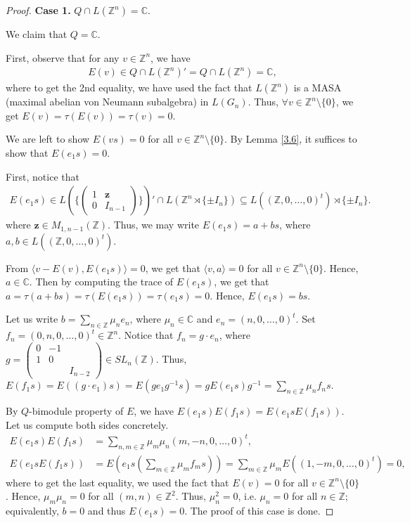 \documentclass[12pt]{amsart}
\theoremstyle{definition}
\theoremstyle{remark}
\begin{document}
\begin{proof}
\textbf{Case 1.} $Q\cap L(\mathbb{Z}^n)=\mathbb{C}$.

We claim that $Q=\mathbb{C}$.


First, observe that for any $v\in \mathbb{Z}^n$, we have 
\begin{align*}
E(v)\in Q\cap L(\mathbb{Z}^n)'=Q\cap L(\mathbb{Z}^n)=\mathbb{C},
\end{align*}
where to get the 2nd equality, we have used the fact that $L(\mathbb{Z}^n)$ is a MASA (maximal abelian von Neumann subalgebra) in $L(G_{n})$.
Thus, $\forall v\in \mathbb{Z}^n\setminus \{0\}$, we get $E(v)=\tau(E(v))=\tau(v)=0$.

We are left to show $E(vs)=0$ for all $v\in\mathbb{Z}^n\setminus \{0\}$. By Lemma \ref{3.6}, it suffices to show that $E(e_1s)=0$. 

First, notice that
\begin{align*}
E(e_1s)\in L(\{\left(\begin{smallmatrix}
1&\boldsymbol{z}\\
0&I_{n-1}
\end{smallmatrix}\right) \})'\cap L(\mathbb{Z}^n\rtimes \{\pm I_{n}\})\subseteq L((\mathbb{Z},0,\dots, 0)^t)\rtimes \{\pm I_{n}\}.
\end{align*}
where $\boldsymbol{z}\in M_{1, n-1}(\mathbb{Z})$. Thus, we may write $E(e_1s)=a+bs$, where $a, b\in L((\mathbb{Z}, 0,\dots,0)^t)$.

From $\langle v-E(v), E(e_1s)\rangle=0$, we get that $\langle v, a \rangle=0$ for all $v\in\mathbb{Z}^n\setminus \{0\}$. Hence, $a\in\mathbb{C}$. Then by computing the trace of $E(e_1s)$, we get that $a=\tau(a+bs)=\tau(E(e_1s))=\tau(e_1s)=0$. Hence, $E(e_1s)=bs$. 

Let us write $b=\sum_{n\in\mathbb{Z}}\mu_ne_n$, where $\mu_n\in\mathbb{C}$ and $e_n=(n,0,\ldots, 0)^t$. Set $f_n=(0, n,0,\dots,0)^t\in\mathbb{Z}^n$. 
Notice that $f_n=g\cdot e_n$, where $g = \left(\begin{smallmatrix}
 0 & -1 \\
1 & 0 \\
     & & I_{n-2}
\end{smallmatrix}\right)\in SL_{n}(\mathbb{Z})$. Thus,
$E(f_1s)=E((g\cdot e_{1})s)=E(ge_{1}g^{-1}s)=gE(e_{1}s)g^{-1}=\sum_{n\in\mathbb{Z}}\mu_n f_ns$. 

By $Q$-bimodule property of $E$, we have $E(e_1s)E(f_1s)=E(e_1sE(f_1s))$. Let us compute both sides concretely.
\begin{align*}
E(e_1s)E(f_1s)&=\sum_{n, m\in\mathbb{Z}}\mu_m\mu_n(m,-n,0,\ldots, 0)^t ,\\
E(e_1sE(f_1s))&=E(e_1s(\sum_{m\in\mathbb{Z}}\mu_mf_ms))=\sum_{m\in\mathbb{Z}}\mu_mE((1,-m,0,\ldots,0)^t)=0,
\end{align*}
where to get the last equality, we used the fact that $E(v)=0$ for all $v\in\mathbb{Z}^n\setminus\{0\}$.
Hence, $\mu_m\mu_n=0$ for all $(m, n)\in\mathbb{Z}^2$. Thus, $\mu_n^2=0$, i.e. $\mu_n=0$ for all $n\in\mathbb{Z}$; equivalently, $b=0$ and thus $E(e_1s)=0$. The proof of this case is done.


\end{proof}
\end{document}
